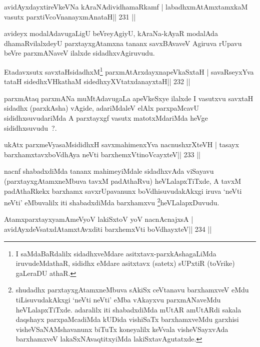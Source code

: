 \begin{shl}
avidAyxdayxtireVkeVNa kAraNAdividhamaRkamf |
labadhxmAtAmxtamxkaM vasutx parxtiVcoV\s nanayxmAnataH\hfill || 231 ||
\end{shl}

\begin{artha}
avideyx modalAdavugaLigU beVreyAgiyU, kAraNa-kAyaR modalAda dhamaRvilalxdeyU parxtayxgAtamxna tananx savxBAvaveV Agiruva rUpavu beVre parxmANaveV ilalxde sidadhxvAgiruvudu.
\end{artha}

\begin{shl}
Etadavxsutx savxtaHsidadhxM\footnote{I saMdaBaRdalilx sidadhxveMdare asitxtavx-parxkAshagaLiMda iruvudeMdathaR, sididhx eMdare asitxtavx (satetx) sUPxtiR (toVrike) gaLeraDU athaR.} parxmAtArxdayxnapeVkaSxtaH |
savaRseyxYva tataH sidedhxVH\footnotemark[\value{footnote}] kathaM sidedhxyXVtatxdanayxtaH\hfill || 232 ||
\end{shl}

\begin{artha}
parxmAtaq parxmANa muMtAdavugaLa apeVkeSxye ilalxde I vasutxvu savxtaH sidadhx (parxkAsha) vAgide, adariMdaleV elAlx parxpaMcavU sididhxsuvudariMda A parxtayxgf vasutx matotxMdariMda heVge sididhxsuvudu~?.
\end{artha}

\begin{shl}
ukAtx parxmeVyasaMsididhxH savxmahimenxYva nacnushxrXteVH |
tasayx barxhamxtavxboVdhAya neVti barxhemxVtinoVcayxteV\hfill || 233 ||
\end{shl}

\begin{artha}
nacnf shabadxdiMda tananx mahimeyiMdale sidadhxvAda viSayavu
(parxtayxgAtamxneMbuva tavxM padAthaRvu) heVLalapxTiTxde, A
tavxM padAthaRkekx barxhamx savxrUpavanunx boVdhisuvudakAkxgi iruva
`neVti neVti' eMbuvalilx iti shabadxdiMda
barxhamxvu \footnote{shudadhx parxtayxgAtamxneMbuva sAkiSx
  ceVtanavu barxhamxveV eMdu tiLisuvudakAkxgi `neVti neVti' eMba
  vAkayxvu parxmANaveMdu heVLalapxTiTxde. adaralilx iti shabadxdiMda
  mUtAR amUtARdi sakala daqshayx parxpaMcadiMda kUDida vishiSaTx
  barxhamxveMdu garxhisi visheVSaNAMshavanunx biTuTx koneyalilx
  keVvala visheVSayxvAda barxhamxveV lakaSxNAvaqtitxyiMda lakiSxtavAgutatxde.}heVLalapxDuvudu.
\end{artha}

\begin{shl}
AtamxparxtayxyamAmeVyoV lakiSxtoV yoV nacnA\s cnajxsA |
avidAyxdeVsatxdAtamxtAvxditi barxhemxVti boVdhayxteV\hfill || 234 ||
\end{shl}

